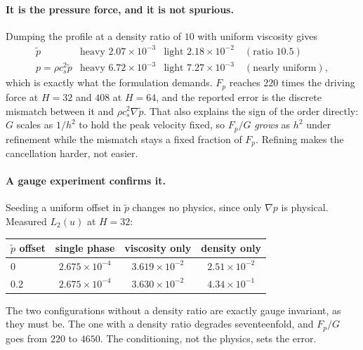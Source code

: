 \documentclass[11pt,a4paper]{article}
\newcommand{\cs}{c_s}
\newcommand{\e}[1]{\times 10^{#1}}
\begin{document}
\paragraph{It is the pressure force, and it is not spurious.} Dumping the profile
at a density ratio of $10$ with uniform viscosity gives
\[
\begin{array}{lll}
  \tilde p              & \text{heavy } 2.07\e{-3} & \text{light } 2.18\e{-2}
                        \quad (\text{ratio } 10.5) \\
  p = \rho\cs^2\tilde p & \text{heavy } 6.72\e{-3} & \text{light } 7.27\e{-3}
                        \quad (\text{nearly uniform}),
\end{array}
\]
which is exactly what the formulation demands. $F_p$ reaches $220$ times the
driving force at $H=32$ and $408$ at $H=64$, and the reported error is the
discrete mismatch between it and $\rho\cs^2\nabla\tilde p$. That also explains the
sign of the order directly: $G$ scales as $1/h^2$ to hold the peak velocity fixed,
so $F_p/G$ \emph{grows} as $h^2$ under refinement while the mismatch stays a fixed
fraction of $F_p$. Refining makes the cancellation harder, not easier.

\paragraph{A gauge experiment confirms it.} Seeding a uniform offset in $\tilde p$
changes no physics, since only $\nabla p$ is physical. Measured $L_2(u)$ at
$H=32$:

\begin{center}\small
\begin{tabular}{lccc}
\toprule
$\tilde p$ offset & single phase & viscosity only & density only \\
\midrule
$0$   & $2.675\e{-4}$ & $3.619\e{-2}$ & $2.51\e{-2}$ \\
$0.2$ & $2.675\e{-4}$ & $3.630\e{-2}$ & $4.34\e{-1}$ \\
\bottomrule
\end{tabular}
\end{center}

\noindent The two configurations without a density ratio are exactly gauge
invariant, as they must be. The one with a density ratio degrades seventeenfold,
and $F_p/G$ goes from $220$ to $4650$. The conditioning, not the physics, sets the
error.
\end{document}
